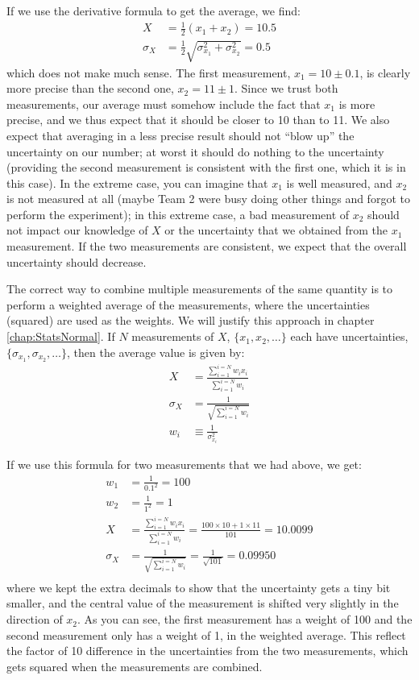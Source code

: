 If we use the derivative formula to get the average, we find:
\begin{align*}
X &= \frac{1}{2} (x_1+x_2)=10.5\\
\sigma_{X} &= \frac{1}{2}\sqrt{\sigma_{x_1}^2+\sigma_{x_2}^2}=0.5
\end{align*}
which does not make much sense. The first measurement, $x_1=10 \pm 0.1$, is clearly more precise than the second one, $x_2=11 \pm 1$. Since we trust both measurements, our average must somehow include the fact that $x_1$ is more precise, and we thus expect that it should be closer to 10 than to 11. We also expect that averaging in a less precise result should not ``blow up'' the uncertainty on our number; at worst it should do nothing to the uncertainty (providing the second measurement is consistent with the first one, which it is in this case). In the extreme case, you can imagine that $x_1$ is well measured, and $x_2$ is not measured at all (maybe Team 2 were busy doing other things and forgot to perform the experiment); in this extreme case, a bad measurement of $x_2$ should not impact our knowledge of $X$ or the uncertainty that we obtained from the $x_1$ measurement. If the two measurements are consistent, we expect that the overall uncertainty should decrease. 

The correct way to combine multiple measurements of the same quantity is to perform a weighted average of the measurements, where the uncertainties (squared) are used as the weights. We will justify this approach in chapter \ref{chap:StatsNormal}. If $N$ measurements of $X$, $\{x_1, x_2 ,\dots\}$ each have uncertainties, $\{\sigma_{x_1}, \sigma_{x_2} ,\dots\}$, then the average value is given by:
\begin{align*}
X &= \frac{\sum_{i=1}^{i=N}w_ix_i}{\sum_{i=1}^{i=N}w_i}\\
\sigma_{X} &= \frac{1}{\sqrt{\sum_{i=1}^{i=N}w_i}}\\
w_i&\equiv\frac{1}{\sigma_{x_i}^2}
\end{align*}

If we use this formula for two measurements that we had above, we get:
\begin{align*}
w_1 &= \frac{1}{0.1^2}=100\\
w_2 &= \frac{1}{1^2}=1\\
X &= \frac{\sum_{i=1}^{i=N}w_ix_i}{\sum_{i=1}^{i=N}w_i}=\frac{100\times 10+1\times 11}{101}=10.0099\\
\sigma_{X} &= \frac{1}{\sqrt{\sum_{i=1}^{i=N}w_i}}=\frac{1}{\sqrt{101}}=0.09950\\
\end{align*}
where we kept the extra decimals to show that the uncertainty gets a tiny bit smaller, and the central value of the measurement is shifted very slightly in the direction of $x_2$. As you can see, the first measurement has a weight of 100 and the second measurement only has a weight of 1, in the weighted average. This reflect the factor of 10 difference in the uncertainties from the two measurements, which gets squared when the measurements are combined. 

